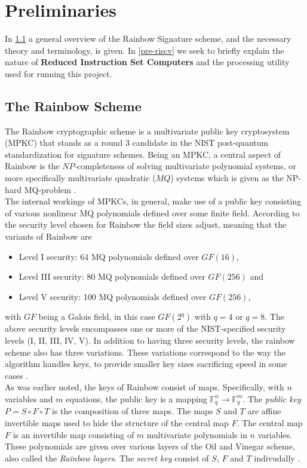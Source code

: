 \section{Preliminaries}
In \cref{rainscheme} a general overview of the Rainbow Signature scheme, and the necessary theory and terminology, is given. In \cref{pre-riscv} we seek to briefly explain the nature of \textbf{Reduced Instruction Set Computers} and the processing utility used for running this project.
\subsection{The Rainbow Scheme} \label{rainscheme}
The Rainbow cryptographic scheme is a multivariate public key cryptosystem (MPKC) that stands as a round 3 candidate in the NIST post-quantum standardization for signature schemes. Being an MPKC, a central aspect of Rainbow is the $NP$-completeness of solving multivariate polynomial systems, or more specifically multivariate quadratic ($MQ$) systems which is given as the NP-hard MQ-problem \cite{multicrypto}. 
\medskip\\
The internal workings of MPKCs, in general, make use of a public key consisting of various nonlinear MQ polynomials defined over some finite field. According to the security level chosen for Rainbow the field sizes adjust, meaning that the variants of Rainbow are 
\begin{itemize}
    \item Level I security: 64 MQ polynomials defined over $GF(16)$,
    \item Level III security: 80 MQ polynomials defined over $GF(256)$ and
    \item Level V security: 100 MQ polynomials defined over $GF(256)$,
\end{itemize}
with $GF$ being a Galois field, in this case $GF(2^q)$ with $q = 4$ or $q=8$. The above security levels encompasses one or more of the NIST-specified security levels (I, II, III, IV, V). In addition to having three security levels, the rainbow scheme also has three variations. These variations correspond to the way the algorithm handles keys, to provide smaller key sizes sacrificing speed in some cases \cite{rainbownist}.
\medskip\\
As was earlier noted, the keys of Rainbow consist of maps. Specifically, with $n$ variables and $m$ equations, the public key is a mapping $\mathbb{F}_q^n \rightarrow \mathbb{F}_q^m$. The \textit{public key} $P = S \circ F \circ T$ is the composition of three maps. The maps $S$ and $T$ are affine invertible maps used to hide the structure of the central map $F$. The central map $F$ is an invertible map consisting of $m$ multivariate polynomials in $n$ variables. These polynomials are given over various layers of the Oil and Vinegar scheme, also called the \textit{Rainbow layers}. The \textit{secret key} consist of $S$, $F$ and $T$ indivudally \cite{multicrypto}.
